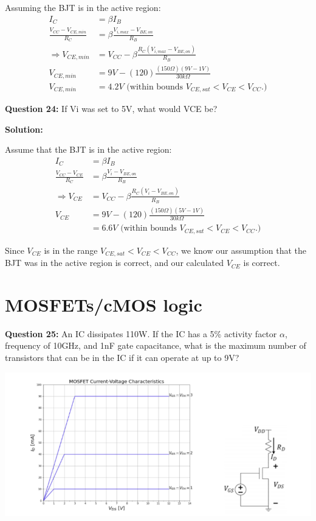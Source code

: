 \documentclass{article}
\begin{document}
Assuming the BJT is in the active region: 
\begin{align*}
    I_C &= \beta I_B \\
    \frac{V_{CC}-V_{CE,min}}{R_C} &= \beta \frac{V_{i,max} - V_{BE,on}}{R_B} \\
    \Rightarrow V_{CE,min} &= V_{CC} - \beta\frac{R_C(V_{i,max} - V_{BE,on})}{R_B} \\
    V_{CE,min} &= 9V - (120)\frac{(150\Omega)(9V-1V)}{30k\Omega} \\
    V_{CE,min}&= \boxed{4.2V} \text{ (within bounds } V_{CE,sat}<V_{CE}< V_{CC}. \text{)}
\end{align*} 

\vspace{5mm}

\textbf{Question 24:} If Vi was set to 5V, what would VCE be?

\textbf{Solution:}

Assume that the BJT is in the active region: 
\begin{align*}
    I_C &= \beta I_B \\
    \frac{V_{CC}-V_{CE}}{R_C} &= \beta \frac{V_i - V_{BE,on}}{R_B} \\
    \Rightarrow V_{CE} &= V_{CC} - \beta\frac{R_C(V_i - V_{BE,on})}{R_B} \\
    V_{CE} &= 9V - (120)\frac{(150\Omega)(5V-1V)}{30k\Omega} \\
    &= \boxed{6.6V} \text{ (within bounds } V_{CE,sat}<V_{CE}< V_{CC}. \text{)}
\end{align*}

Since $V_{CE}$ is in the range $V_{CE,sat} < V_{CE} < V_{CC}$, we know our assumption that the BJT was in the active region is correct, and our calculated $V_{CE}$ is correct.


\section*{MOSFETs/cMOS logic}
\textbf{Question 25:} An IC dissipates 110W. If the IC has a 5\% activity factor \(\alpha\), frequency of 10GHz, and 1nF gate capacitance, what is the maximum number of transistors that can be in the IC if it can operate at up to 9V?

\begin{center}

        \includegraphics[width=1\linewidth]{figures/78.png}
\end{center}
\end{document}
